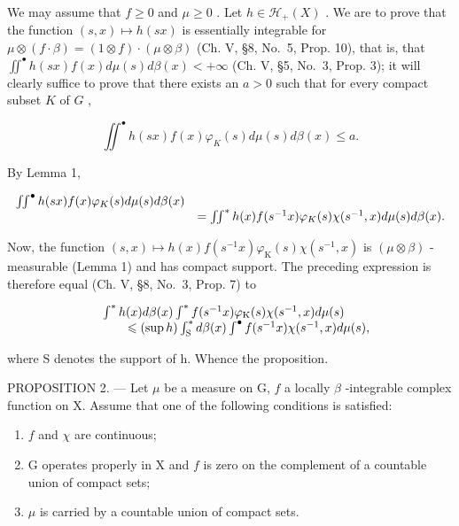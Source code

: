 We may assume that \(f \geqslant 0\) and \(\mu \geqslant 0\) . Let \(h \in \mathcal{H}_{+}(X)\) . We are to prove that the function \((s, x) \mapsto h(sx)\) is essentially integrable for \(\mu \otimes (f \cdot \beta) = (1 \otimes f) \cdot (\mu \otimes \beta)\) (Ch. V, §8, No.~5, Prop. 10), that is, that \(\iint^{\bullet} h(sx)f(x)d\mu(s)d\beta(x) < +\infty\) (Ch. V, §5, No.~3, Prop. 3); it will clearly suffice to prove that there exists an \(a > 0\) such that for every compact subset \(K\) of \(G\) ,

\[
\iint^ {\bullet} h (s x) f (x) \varphi_ {K} (s) d \mu (s) d \beta (x) \leqslant a.
\]

By Lemma 1,

\[
\begin{array}{r l} \iint^ {\bullet} h (s x) f (x) \varphi_ {K} (s) d \mu (s) d \beta (x) \\ & = \iint^ {*} h (x) f (s ^ {- 1} x) \varphi_ {K} (s) \chi (s ^ {- 1}, x) d \mu (s) d \beta (x). \end{array}
\]

Now, the function \((s,x)\mapsto h(x)f(s^{-1}x)\varphi_{\mathrm{K}}(s)\chi(s^{-1},x)\) is \((\mu\otimes\beta)\) -measurable (Lemma 1) and has compact support. The preceding expression is therefore equal (Ch. V, §8, No.~3, Prop. 7) to

\[
\begin{array}{r l} & {\int^ {*} h (x) d \beta (x) \int^ {*} f (s ^ {- 1} x) \varphi_ {\mathrm{K}} (s) \chi (s ^ {- 1}, x) d \mu (s)} \\ & {\qquad \leqslant (\sup h) \int_ {\mathrm{S}} ^ {*} d \beta (x) \int^ {\bullet} f (s ^ {- 1} x) \chi (s ^ {- 1}, x) d \mu (s),} \end{array}
\]

where S denotes the support of h. Whence the proposition.

PROPOSITION 2. --- Let \(\mu\) be a measure on G, \(f\) a locally \(\beta\) -integrable complex function on X. Assume that one of the following conditions is satisfied:

\begin{enumerate}
\def\labelenumi{(\roman{enumi})}
\item
  \(f\) and \(\chi\) are continuous;
\item
  G operates properly in X and \(f\) is zero on the complement of a countable union of compact sets;
\item
  \(\mu\) is carried by a countable union of compact sets.
\end{enumerate}

